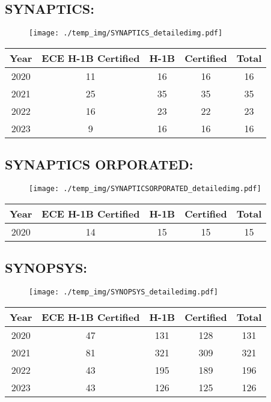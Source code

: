 \documentclass{article}%
\begin{document}
%
\newpage%
\subsection{SYNAPTICS:}%
\label{subsec:SYNAPTICS}%
\label{SYNAPTICSdetailed}%


\begin{figure}[htbp]%
\centering%
\texttt{[image: ./temp\_img/SYNAPTICS\_detailedimg.pdf]}%
\end{figure}

%
\begin{longtable}{c|c|c|c|c}%
\hline%
Year&ECE H{-}1B Certified&H{-}1B&Certified&Total\\%
\hline%
2020&11&16&16&16\\%
\hline%
2021&25&35&35&35\\%
\hline%
2022&16&23&22&23\\%
\hline%
2023&9&16&16&16\\%
\hline%
\end{longtable}

%
\newpage%
\subsection{SYNAPTICS ORPORATED:}%
\label{subsec:SYNAPTICSORPORATED}%
\label{SYNAPTICSORPORATEDdetailed}%


\begin{figure}[htbp]%
\centering%
\texttt{[image: ./temp\_img/SYNAPTICSORPORATED\_detailedimg.pdf]}%
\end{figure}

%
\begin{longtable}{c|c|c|c|c}%
\hline%
Year&ECE H{-}1B Certified&H{-}1B&Certified&Total\\%
\hline%
2020&14&15&15&15\\%
\hline%
\end{longtable}

%
\newpage%
\subsection{SYNOPSYS:}%
\label{subsec:SYNOPSYS}%
\label{SYNOPSYSdetailed}%


\begin{figure}[htbp]%
\centering%
\texttt{[image: ./temp\_img/SYNOPSYS\_detailedimg.pdf]}%
\end{figure}

%
\begin{longtable}{c|c|c|c|c}%
\hline%
Year&ECE H{-}1B Certified&H{-}1B&Certified&Total\\%
\hline%
2020&47&131&128&131\\%
\hline%
2021&81&321&309&321\\%
\hline%
2022&43&195&189&196\\%
\hline%
2023&43&126&125&126\\%
\hline%
\end{longtable}
\end{document}
